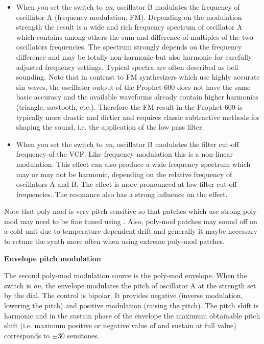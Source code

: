\begin{itemize}
  \item When you set the \polymodfreq switch to \textit{on}, oscillator B modulates the frequency of oscillator A (frequency modulation, FM). Depending on the modulation strength the result is a wide and rich frequency spectrum of oscillator A which contains among others the sum and difference of multiples of the two oscillators frequencies. The spectrum strongly depends on the frequency difference and may be totally non-harmonic but also harmonic for carefully adjusted frequency settings. Typical spectra are often described as bell sounding. Note that in contrast to FM synthesizers which use highly accurate sin waves, the oscillator output of the Prophet-600 does not have the same basic accuracy and the available waveforms already contain higher harmonics (triangle, sawtooth, etc.). Therefore the FM result in the Prophet-600 is typically more drastic and dirtier and requires classic subtractive methods for shaping the sound, i.e. the application of the low pass filter. 
  \item When you set the \polymodfilter switch to \textit{on}, oscillator B modulates the filter cut-off frequency of the VCF. Like frequency modulation this is a non-linear modulation. This effect can also produce a wide frequency spectrum which may or may not be harmonic, depending on the relative frequency of oscillators A and B. The effect is more pronounced at low filter cut-off frequencies. The resonance also has a strong influence on the effect.  
\end{itemize}

Note that poly-mod is very pitch sensitive so that patches which use strong poly-mod may need to be fine tuned using \freqfine. Also, poly-mod patches may sound off on a cold unit due to temperature dependent drift and generally it maybe necessary to retune the synth more often when using extreme poly-mod patches.

\textbf{Envelope pitch modulation}

The second poly-mod modulation source is the poly-mod envelope. When the \polymodfreq switch is \textit{on}, the envelope modulates the pitch of oscillator A at the strength set by the \polymodenv dial. The \polymodenv control is bipolar. It  provides negative (inverse modulation, lowering the pitch) and positive modulation (raising the pitch). The pitch shift is harmonic and in the sustain phase of the envelope the maximum obtainable pitch shift (i.e. maximum positive or negative value of \polymodenv and sustain at full value) corresponds to $\pm 30$ semitones.

